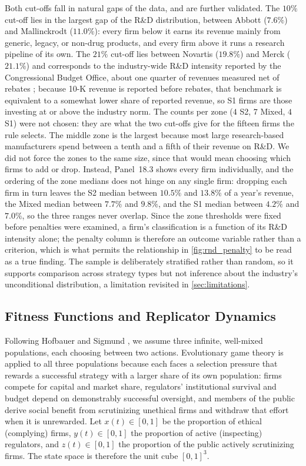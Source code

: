 \documentclass[10pt]{article}
\begin{document}
Both cut-offs fall in natural gaps of the data, and are further validated. The $10\%$ cut-off lies in the largest gap of the R\&D distribution, between Abbott ($7.6\%$) and Mallinckrodt ($11.0\%$): every firm below it earns its revenue mainly from generic, legacy, or non-drug products, and every firm above it runs a research pipeline of its own. The $21\%$ cut-off lies between Novartis ($19.8\%$) and Merck ($21.1\%$) and corresponds to the industry-wide R\&D intensity reported by the Congressional Budget Office, about one quarter of revenues measured net of rebates \cite{cbo2021}; because 10-K revenue is reported before rebates, that benchmark is equivalent to a somewhat lower share of reported revenue, so S1 firms are those investing at or above the industry norm. The counts per zone ($4$ S2, $7$ Mixed, $4$ S1) were not chosen: they are what the two cut-offs give for the fifteen firms the rule selects. The middle zone is the largest because most large research-based manufacturers spend between a tenth and a fifth of their revenue on R\&D. We did not force the zones to the same size, since that would mean choosing which firms to add or drop. Instead, Panel~18.3 shows every firm individually, and the ordering of the zone medians does not hinge on any single firm: dropping each firm in turn leaves the S2 median between $10.5\%$ and $13.8\%$ of a year's revenue, the Mixed median between $7.7\%$ and $9.8\%$, and the S1 median between $4.2\%$ and $7.0\%$, so the three ranges never overlap. Since the zone thresholds were fixed before penalties were examined, a firm's classification is a function of its R\&D intensity alone; the penalty column is therefore an outcome variable rather than a criterion, which is what permits the relationship in \cref{fig:rnd_penalty} to be read as a true finding. The sample is deliberately stratified rather than random, so it supports comparison across strategy types but not inference about the industry's unconditional distribution, a limitation revisited in \cref{sec:limitations}.

\subsection{Fitness Functions and Replicator Dynamics}\label{sec:model}
Following Hofbauer and Sigmund \cite{hofbauer1998}, we assume three infinite, well-mixed populations, each choosing between two actions. Evolutionary game theory is applied to all three populations because each faces a selection pressure that rewards a successful strategy with a larger share of its own population: firms compete for capital and market share, regulators' institutional survival and budget depend on demonstrably successful oversight, and members of the public derive social benefit from scrutinizing unethical firms and withdraw that effort when it is unrewarded. Let $x(t)\in[0,1]$ be the proportion of ethical (complying) firms, $y(t)\in[0,1]$ the proportion of active (inspecting) regulators, and $z(t)\in[0,1]$ the proportion of the public actively scrutinizing firms. The state space is therefore the unit cube $[0,1]^3$.
\end{document}
